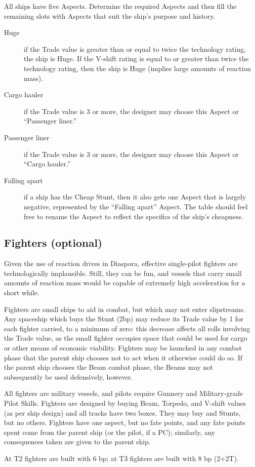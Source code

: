 All ships have five Aspects. Determine the required Aspects and then
fill the remaining slots with Aspects that suit the ship's purpose and
history.
\begin{description}
\item[Huge]
if the Trade value is greater than or equal to twice the technology rating,
the ship is Huge. If the V-shift rating is equal to or greater than twice the
technology rating, then the ship is Huge (implies large amounts of reaction
mass).
\item[Cargo hauler]
if the Trade value is 3 or more, the designer may choose this Aspect or
``Passenger liner.''
\item[Passenger liner]
if the Trade value is 3 or more, the designer may choose this Aspect or ``Cargo
hauler.''
\item[Falling apart]
if a ship has the Cheap Stunt, then it also gets one Aspect that is largely
negative, represented by the ``Falling apart'' Aspect. The table should feel free
to rename the Aspect to reflect the specifics of the ship's cheapness.
\end{description}

\subsection{Fighters (optional)}\label{sec:spacecraft-fighters} %

Given the use of reaction drives in Diaspora, effective single-pilot fighters are technologically implausible. Still, they can be fun, and vessels that carry small amounts of reaction mass would be capable of extremely high acceleration for a short while.



Fighters are small ships to aid in combat, but which may not enter
slipstreams. Any spaceship which buys the Stunt 
(2bp) may reduce its Trade value by 1 for each fighter carried, to a
minimum of zero: this decrease affects all rolls involving the Trade
value, as the small fighter occupies space that could be used for
cargo or other means of economic viability. Fighters may be launched
in any combat phase that the parent ship chooses not to act when it
otherwise could do so. If the parent ship chooses the Beam combat
phase, the Beams may not subsequently be used defensively, however.

All fighters are military vessels, and pilots require Gunnery and
Military-grade Pilot Skills. Fighters are designed by buying Beam,
Torpedo, and V-shift values (as per ship design) and all tracks have
two boxes. They may buy  and  Stunts, but no others. Fighters have one aspect, but no fate
points, and any fate points spent come from the parent ship (or the
pilot, if a PC); similarly, any consequences taken are given to the
parent ship.

At T2 fighters are built with 6 bp; at T3 fighters are built with 8 bp (2+2T).
